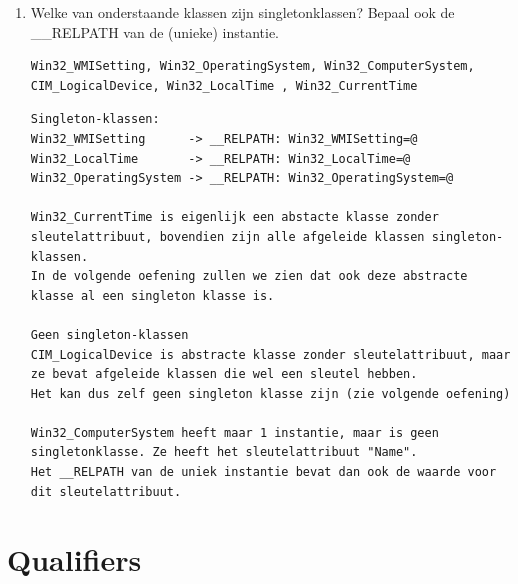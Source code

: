 \documentclass[11pt,a4paper]{report}
\begin{document}
\begin{enumerate}[resume]
	\item Welke van onderstaande klassen zijn singletonklassen? Bepaal ook de \_\_RELPATH van de (unieke) instantie.
	\begin{lstlisting}
Win32_WMISetting, Win32_OperatingSystem, Win32_ComputerSystem,
CIM_LogicalDevice, Win32_LocalTime , Win32_CurrentTime
	\end{lstlisting}
	\begin{lstlisting}
Singleton-klassen:
Win32_WMISetting      -> __RELPATH: Win32_WMISetting=@
Win32_LocalTime       -> __RELPATH: Win32_LocalTime=@
Win32_OperatingSystem -> __RELPATH: Win32_OperatingSystem=@

Win32_CurrentTime is eigenlijk een abstacte klasse zonder sleutelattribuut, bovendien zijn alle afgeleide klassen singleton-klassen.
In de volgende oefening zullen we zien dat ook deze abstracte klasse al een singleton klasse is. 

Geen singleton-klassen
CIM_LogicalDevice is abstracte klasse zonder sleutelattribuut, maar ze bevat afgeleide klassen die wel een sleutel hebben. 
Het kan dus zelf geen singleton klasse zijn (zie volgende oefening) 

Win32_ComputerSystem heeft maar 1 instantie, maar is geen singletonklasse. Ze heeft het sleutelattribuut "Name".
Het __RELPATH van de uniek instantie bevat dan ook de waarde voor dit sleutelattribuut.
	\end{lstlisting}
\end{enumerate}
\section{Qualifiers}
\end{document}
